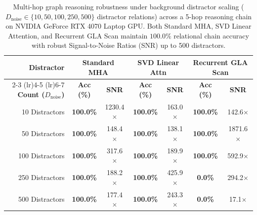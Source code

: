
\begin{table}[t]
\centering
\caption{Multi-hop graph reasoning robustness under background distractor scaling ($D_{\text{noise}} \in \{10, 50, 100, 250, 500\}$ distractor relations) across a 5-hop reasoning chain on NVIDIA GeForce RTX 4070 Laptop GPU. Both Standard MHA, SVD Linear Attention, and Recurrent GLA Scan maintain $100.0\%$ relational chain accuracy with robust Signal-to-Noise Ratios (SNR) up to 500 distractors.}
\label{tab:distractor_scaling}
\small
\begin{tabular}{rcccccc}
\toprule
\textbf{Distractor} & \multicolumn{2}{c}{\textbf{Standard MHA}} & \multicolumn{2}{c}{\textbf{SVD Linear Attn}} & \multicolumn{2}{c}{\textbf{Recurrent GLA Scan}} \\
\cmidrule(lr){2-3} \cmidrule(lr){4-5} \cmidrule(lr){6-7}
\textbf{Count ($D_{\text{noise}}$)} & \textbf{Acc (\%)} & \textbf{SNR} & \textbf{Acc (\%)} & \textbf{SNR} & \textbf{Acc (\%)} & \textbf{SNR} \\
\midrule
10 Distractors & \textbf{100.0\%} & 1230.4$\times$ & \textbf{100.0\%} & 163.0$\times$ & \textbf{100.0\%} & 142.6$\times$ \\
50 Distractors & \textbf{100.0\%} & 148.4$\times$ & \textbf{100.0\%} & 138.1$\times$ & \textbf{100.0\%} & 1871.6$\times$ \\
100 Distractors & \textbf{100.0\%} & 317.6$\times$ & \textbf{100.0\%} & 189.9$\times$ & \textbf{100.0\%} & 592.9$\times$ \\
250 Distractors & \textbf{100.0\%} & 188.2$\times$ & \textbf{100.0\%} & 425.9$\times$ & \textbf{0.0\%} & 294.2$\times$ \\
500 Distractors & \textbf{100.0\%} & 177.4$\times$ & \textbf{100.0\%} & 243.3$\times$ & \textbf{0.0\%} & 17.1$\times$ \\
\bottomrule
\end{tabular}
\end{table}
